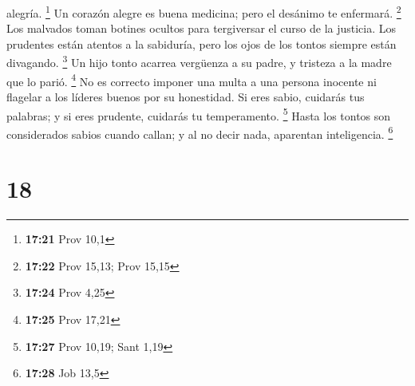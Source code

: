 alegría. \footnote{\textbf{17:21} Prov 10,1}  Un corazón
alegre es buena medicina; pero el desánimo te enfermará. \footnote{\textbf{17:22}
  Prov 15,13; Prov 15,15}  Los malvados toman botines
ocultos para tergiversar el curso de la justicia.  Los
prudentes están atentos a la sabiduría, pero los ojos de los tontos
siempre están divagando. \footnote{\textbf{17:24} Prov 4,25}
 Un hijo tonto acarrea vergüenza a su padre, y tristeza a
la madre que lo parió. \footnote{\textbf{17:25} Prov 17,21}
 No es correcto imponer una multa a una persona inocente ni
flagelar a los líderes buenos por su honestidad.  Si eres
sabio, cuidarás tus palabras; y si eres prudente, cuidarás tu
temperamento. \footnote{\textbf{17:27} Prov 10,19; Sant 1,19}
 Hasta los tontos son considerados sabios cuando callan; y
al no decir nada, aparentan inteligencia. \footnote{\textbf{17:28} Job
  13,5}

\hypertarget{section-17}{%
\section{18}\label{section-17}}

